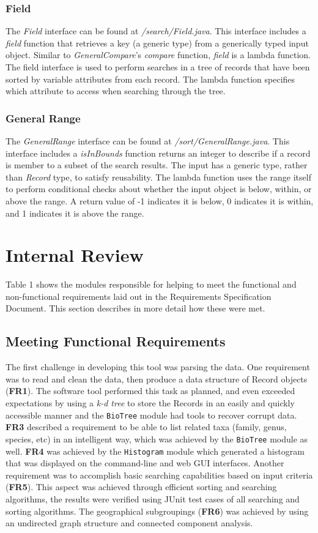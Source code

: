 \documentclass{article}
\begin{document}
\subsubsection{Field}
The \textit{Field} interface can be found at \textit{/search/Field.java}. This interface includes a \textit{field} function that retrieves a key (a generic type) from a generically typed input object. Similar to \textit{GeneralCompare}'s \textit{compare} function, \textit{field} is a lambda function. The field interface is used to perform searches in a tree of records that have been sorted by variable attributes from each record. The lambda function specifies which attribute to access when searching through the tree.

\subsubsection{General Range}
The \textit{GeneralRange} interface can be found at \textit{/sort/GeneralRange.java}. This interface includes a \textit{isInBounds} function returns an integer to describe if a record is member to a subset of the search results. The input has a generic type, rather than \textit{Record} type, to satisfy reusability. The lambda function uses the range itself to perform conditional checks about whether the input object is below, within, or above the range. A return value of -1 indicates it is below, 0 indicates it is within, and 1 indicates it is above the range.

\section{Internal Review}
Table 1 shows the modules responsible for helping to meet the functional and non-functional requirements laid out in the Requirements Specification Document. This section describes in more detail how these were met.

\subsection{Meeting Functional Requirements}
The first challenge in developing this tool was parsing the data. One requirement was to read and clean the data, then produce a data structure of Record objects (\textbf{FR1}). The software tool performed this task as planned, and even exceeded expectations by using a \textit{k-d tree} to store the Records in an easily and quickly accessible manner and the \texttt{BioTree} module had tools to recover corrupt data. \textbf{FR3} described a requirement to be able to list related taxa (family, genus, species, etc) in an intelligent way, which was achieved by the \texttt{BioTree} module as well. \textbf{FR4} was achieved by the \texttt{Histogram} module which generated a histogram that was displayed on the command-line and web GUI interfaces. Another requirement was to accomplish basic searching capabilities based on input criteria (\textbf{FR5}). This aspect was achieved through efficient sorting and searching algorithms, the results were verified using JUnit test cases of all searching and sorting algorithms. The geographical subgroupings (\textbf{FR6}) was achieved by using an undirected graph structure and connected component analysis.
\end{document}
